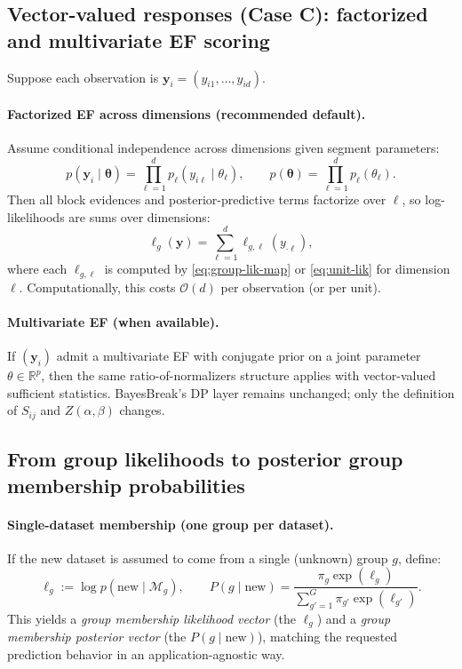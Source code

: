 \subsection{Vector-valued responses (Case C): factorized and multivariate EF scoring}
\label{sec:prediction-multivariate-response}

Suppose each observation is $\mathbf{y}_i=(y_{i1},\dots,y_{id})$.

\paragraph{Factorized EF across dimensions (recommended default).}
Assume conditional independence across dimensions given segment parameters:
\[
p(\mathbf{y}_i\mid \boldsymbol{\theta})
=\prod_{\ell=1}^d p_\ell(y_{i\ell}\mid \theta_\ell),
\qquad
p(\boldsymbol{\theta})=\prod_{\ell=1}^d p_\ell(\theta_\ell).
\]
Then all block evidences and posterior-predictive terms factorize over $\ell$, so
log-likelihoods are sums over dimensions:
\[
\ell_g(\mathbf{y})=\sum_{\ell=1}^d \ell_{g,\ell}(y_{\cdot\ell}),
\]
where each $\ell_{g,\ell}$ is computed by \eqref{eq:group-lik-map} or \eqref{eq:unit-lik} for
dimension $\ell$. Computationally, this costs $\mathcal{O}(d)$ per observation (or per unit).

\paragraph{Multivariate EF (when available).}
If $(\mathbf{y}_i)$ admit a multivariate EF with conjugate prior on a joint parameter
$\theta\in\mathbb{R}^p$, then the same ratio-of-normalizers structure applies with vector-valued
sufficient statistics. BayesBreak’s DP layer remains unchanged; only the definition of $S_{ij}$
and $Z(\alpha,\beta)$ changes.

\subsection{From group likelihoods to posterior group membership probabilities}
\label{sec:group-posterior}

\paragraph{Single-dataset membership (one group per dataset).}
If the new dataset is assumed to come from a single (unknown) group $g$, define:
\[
\ell_g := \log p(\text{new}\mid \mathcal{M}_g),
\qquad
P(g\mid \text{new})
= \frac{\pi_g\exp(\ell_g)}{\sum_{g'=1}^G \pi_{g'}\exp(\ell_{g'})}.
\]
This yields a \emph{group membership likelihood vector} (the $\ell_g$) and a
\emph{group membership posterior vector} (the $P(g\mid\text{new})$), matching the requested
prediction behavior in an application-agnostic way.

